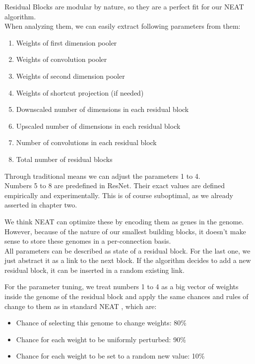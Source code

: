 Residual Blocks are modular by nature, so they are a perfect fit for our NEAT algorithm.\\
When analyzing them, we can easily extract following parameters from them:\\
\begin{enumerate}
	\item{Weights of first dimension pooler}
	\item{Weights of convolution pooler}
	\item{Weights of second dimension pooler}
	\item{Weights of shortcut projection (if needed)}
	\item{Downscaled number of dimensions in each residual block}
	\item{Upscaled number of dimensions in each residual block}
	\item{Number of convolutions in each residual block}
	\item{Total number of residual blocks}
\end{enumerate}  
Through traditional means we can adjust the parameters 1 to 4. \\
Numbers 5 to 8 are predefined in ResNet. 
Their exact values are defined empirically and experimentally. This is of course suboptimal, as we already asserted in chapter two.

We think NEAT can optimize these by encoding them as genes in the genome. \\
However, because of the nature of our smallest building blocks, it doesn't make sense to store these genomes in a per-connection basis.\\
All parameters can be described as state of a residual block. For the last one, we just abstract it as a link to the next block. If the algorithm decides to add a new residual block, it can be inserted in a random existing link.

For the parameter tuning, we treat numbers 1 to 4 as a big vector of weights inside the genome of the residual block and apply the same chances and rules of change to them as in standard NEAT , which are:
\begin{itemize}
	\item{Chance of selecting this genome to change weights: 80\%}
	\item{Chance for each weight to be uniformly perturbed: 90\%}
	\item{Chance for each weight to be set to a random new value: 10\%}
\end{itemize}
\cite{Stanley2002}\\

